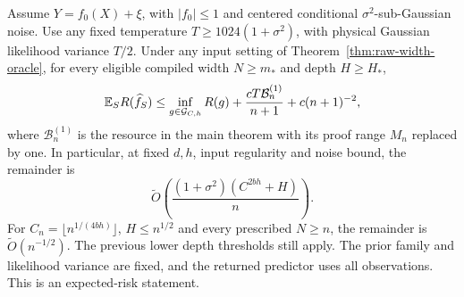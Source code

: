 \begin{proposition}
\label{prop:bounded-readout-width}
Assume $Y=f_0(X)+\xi$, with $|f_0|\le1$ and centered conditional
$\sigma^2$-sub-Gaussian noise.  Use any fixed temperature
$T\ge1024(1+\sigma^2)$, with physical Gaussian likelihood variance
$T/2$.  Under any input setting of Theorem~\ref{thm:raw-width-oracle},
for every eligible compiled width $N\ge m_*$ and depth $H\ge H_*$,
\[
 \mathbb E_S R(\widehat f_S)
 \le\inf_{g\in\mathcal G_{C,h}}R(g)
                +\frac{cT\mathcal B_n^{(1)}}{n+1}+c(n+1)^{-2},
\]
where $\mathcal B_n^{(1)}$ is the resource in the main theorem with its
proof range $M_n$ replaced by one.  In particular, at fixed $d,h$,
input regularity and noise bound, the remainder is
\[
 \widetilde O\left(\frac{(1+\sigma^2)(C^{2bh}+H)}n\right).
\]
For $C_n=\lfloor n^{1/(4bh)}\rfloor$, $H\le n^{1/2}$ and every
prescribed $N\ge n$, the remainder is $\widetilde O(n^{-1/2})$.
The previous lower depth thresholds still apply.  The prior family and
likelihood variance are fixed, and the returned predictor uses all
observations.  This is an expected-risk statement.
\end{proposition}
